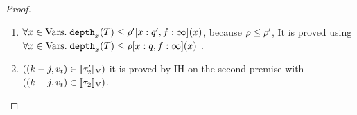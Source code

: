 \begin{proof}
\begin{enumerate}
\item $\forall x \in \mbox{Vars}.\;  \mathtt{depth}_{x}(T) \leq \rho'[x:q', f: \infty](x) $, because $\rho \leq \rho'$, It is proved using $\forall x \in \mbox{Vars}.\;  \mathtt{depth}_{x}(T) \leq \rho[x:q, f: \infty](x) $ . \\
\item $((k - j,  v_t) \in [\![ \tau_2' ]\!]_{\text{V}})$ it is proved by IH on the second premise with $ ((k - j,  v_t) \in [\![ \tau_2 ]\!]_{\text{V}})$. \\
\end{enumerate}







\end{proof}
